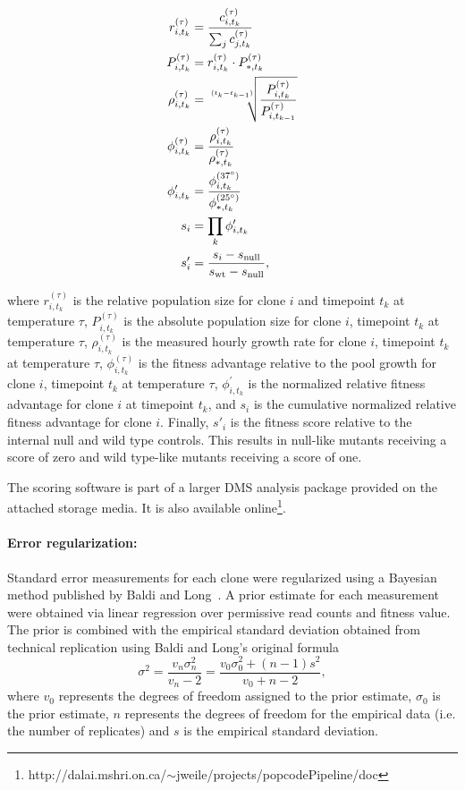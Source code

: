 \begin{align*}
r_{i,t_k}^{(\tau)} &= \frac{ c_{i,t_k}^{(\tau)} }{ \sum_j c_{j,t_k}^{(\tau)} }\\
P_{i,t_k}^{(\tau)} &= r_{i,t_k}^{(\tau)} \cdot P_{*,t_k}^{(\tau)} \\
\rho_{i,t_k}^{(\tau)} &= \sqrt[\uproot{5}(t_k - t_{k-1})]{\frac{P_{i,t_k}^{(\tau)}}{P_{i,t_{k-1}}^{(\tau)}}} \\
\phi_{i,t_k}^{(\tau)} &= \frac{\rho_{i,t_k}^{(\tau)}}{\rho_{*,t_k}^{(\tau)}}\\
\phi_{i,t_k}^\prime &= \frac{\phi_{i,t_k}^{(37^{\circ})}}{\phi_{*,t_k}^{(25^{\circ})}}\\
s_i &= \prod_k \phi_{i,t_k}^\prime \\
s'_i &= \frac{s_i - s_\text{null}}{s_\text{wt} - s_\text{null}},
\end{align*}

where $r_{i,t_k}^{(\tau)}$ is the relative population size for clone $i$ and timepoint $t_k$ at temperature $\tau$, $P_{i,t_k}^{(\tau)}$ is the absolute population size for clone $i$, timepoint $t_k$ at temperature $\tau$, $\rho_{i,t_k}^{(\tau)}$ is the measured hourly growth rate for clone $i$, timepoint $t_k$ at temperature $\tau$, $\phi_{i,t_k}^{(\tau)}$ is the fitness advantage relative to the pool growth for clone $i$, timepoint $t_k$ at temperature $\tau$, $\phi_{i,t_k}^\prime$ is the normalized relative fitness advantage for clone $i$ at timepoint $t_k$, and $s_i$ is the cumulative normalized relative fitness advantage for clone $i$. Finally, $s'_i$ is the fitness score relative to the internal null and wild type controls. This results in null-like mutants receiving a score of zero and wild type-like mutants receiving a score of one.

The scoring software is part of a larger DMS analysis package provided on the attached storage media. It is also available online\footnote{http://dalai.mshri.on.ca/$\sim$jweile/projects/popcodePipeline/doc}.

\paragraph{Error regularization: } Standard error measurements for each clone were regularized using a Bayesian method published by Baldi and Long~\cite{baldi_bayesian_2001}. A prior estimate for each measurement were obtained via linear regression over permissive read counts and fitness value. The prior is combined with the empirical standard deviation obtained from technical replication using Baldi and Long's original formula $$\sigma^2 = \frac{v_n \sigma_n^2}{v_n - 2} = \frac{v_0 \sigma_0^2 + (n-1)s^2}{v_0 + n - 2},$$ where $v_0$ represents the degrees of freedom assigned to the prior estimate, $\sigma_0$ is the prior estimate, $n$ represents the degrees of freedom for the empirical data (i.e. the number of replicates) and $s$ is the empirical standard deviation.


